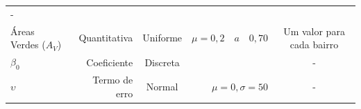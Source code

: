\documentclass[
  a4paper, 12pt]{article}
\begin{document}
\begin{longtable}[]{@{}lrcrc@{}}
\begin{minipage}[t]{0.21\columnwidth}
-\strut
\end{minipage}\tabularnewline
\begin{minipage}[t]{0.18\columnwidth}\raggedright
Áreas Verdes (\(A_V\))\strut
\end{minipage} & \begin{minipage}[t]{0.12\columnwidth}\raggedleft
Quantitativa\strut
\end{minipage} & \begin{minipage}[t]{0.11\columnwidth}\centering
Uniforme\strut
\end{minipage} & \begin{minipage}[t]{0.25\columnwidth}\raggedleft
\(\mu = 0,2 \quad a \quad 0,70\)\strut
\end{minipage} & \begin{minipage}[t]{0.21\columnwidth}\centering
Um valor para cada bairro\strut
\end{minipage}\tabularnewline
\begin{minipage}[t]{0.18\columnwidth}\raggedright
\(\beta_{0}\)\strut
\end{minipage} & \begin{minipage}[t]{0.12\columnwidth}\raggedleft
Coeficiente\strut
\end{minipage} & \begin{minipage}[t]{0.11\columnwidth}\centering
Discreta\strut
\end{minipage} & \begin{minipage}[t]{0.25\columnwidth}\raggedleft
2000\strut
\end{minipage} & \begin{minipage}[t]{0.21\columnwidth}\centering
-\strut
\end{minipage}\tabularnewline
\begin{minipage}[t]{0.18\columnwidth}\raggedright
\(\upsilon\)\strut
\end{minipage} & \begin{minipage}[t]{0.12\columnwidth}\raggedleft
Termo de erro\strut
\end{minipage} & \begin{minipage}[t]{0.11\columnwidth}\centering
Normal\strut
\end{minipage} & \begin{minipage}[t]{0.25\columnwidth}\raggedleft
\(\mu = 0, \sigma = 50\)\strut
\end{minipage} & \begin{minipage}[t]{0.21\columnwidth}\centering
-\strut
\end{minipage}\tabularnewline

\end{longtable}
\end{document}
